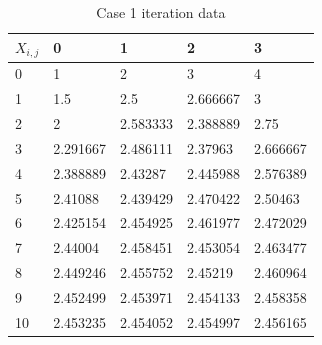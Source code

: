 \documentclass[conference]{IEEEtran}
\begin{document}

\begin{table}[htbp]
    \centering
    \caption{Case 1 iteration data}
    \begin{tabular}{lllll}
    \hline
    \hline
    $X_{i,j}$   & 0        & 1        & 2        & 3        \\ \hline
    0  & 1        & 2        & 3        & 4        \\ 
    1  & 1.5      & 2.5      & 2.666667 & 3        \\ 
    2  & 2        & 2.583333 & 2.388889 & 2.75     \\ 
    3  & 2.291667 & 2.486111 & 2.37963  & 2.666667 \\ 
    4  & 2.388889 & 2.43287  & 2.445988 & 2.576389 \\ 
    5  & 2.41088  & 2.439429 & 2.470422 & 2.50463  \\ 
    6  & 2.425154 & 2.454925 & 2.461977 & 2.472029 \\ 
    7  & 2.44004  & 2.458451 & 2.453054 & 2.463477 \\ 
    8  & 2.449246 & 2.455752 & 2.45219  & 2.460964 \\ 
    9  & 2.452499 & 2.453971 & 2.454133 & 2.458358 \\ 
    10 & 2.453235 & 2.454052 & 2.454997 & 2.456165 \\ 
    \hline
    \hline
    \end{tabular}
    \label{tab:Result-1234}
\end{table}
\end{document}
